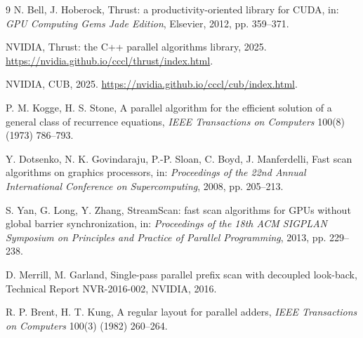 \begin{chapterbibliography}{9}
  N. Bell, J. Hoberock, Thrust: a productivity-oriented library for CUDA,
  in: \emph{GPU Computing Gems Jade Edition}, Elsevier, 2012, pp. 359--371.

  NVIDIA, Thrust: the C++ parallel algorithms library, 2025.
  \url{https://nvidia.github.io/cccl/thrust/index.html}.

  NVIDIA, CUB, 2025.
  \url{https://nvidia.github.io/cccl/cub/index.html}.

  P. M. Kogge, H. S. Stone, A parallel algorithm for the efficient solution of a
  general class of recurrence equations, \emph{IEEE Transactions on Computers}
  100(8) (1973) 786--793.

  Y. Dotsenko, N. K. Govindaraju, P.-P. Sloan, C. Boyd, J. Manferdelli,
  Fast scan algorithms on graphics processors, in: \emph{Proceedings of the 22nd
  Annual International Conference on Supercomputing}, 2008, pp. 205--213.

  S. Yan, G. Long, Y. Zhang, StreamScan: fast scan algorithms for GPUs without
  global barrier synchronization, in: \emph{Proceedings of the 18th ACM SIGPLAN
  Symposium on Principles and Practice of Parallel Programming}, 2013, pp. 229--238.

  D. Merrill, M. Garland, Single-pass parallel prefix scan with decoupled look-back,
  Technical Report NVR-2016-002, NVIDIA, 2016.

  R. P. Brent, H. T. Kung, A regular layout for parallel adders,
  \emph{IEEE Transactions on Computers} 100(3) (1982) 260--264.
\end{chapterbibliography}
